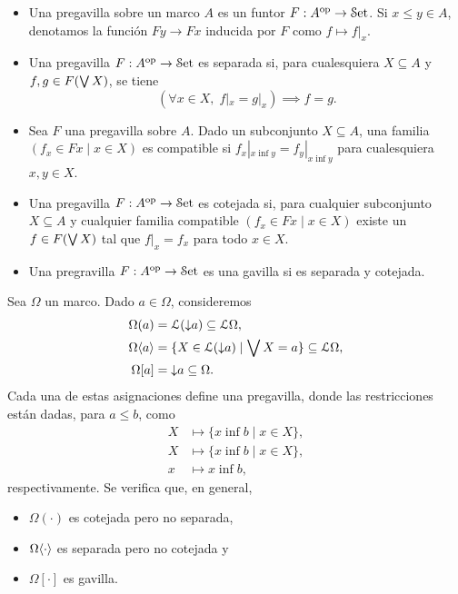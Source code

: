\begin{definition}
    \leavevmode
    \begin{itemize}
        \item
        Una pregavilla sobre un marco $A$
        es un funtor $F:A^{\mathrm{op}}\to\mathcal{S}\mathrm{et}$.
        Si $x\leq y\in A$, denotamos la función
        $Fy\to Fx$ inducida por $F$ como $f\mapsto f|_x$.
        \item
        Una pregavilla $F:A^{\mathrm{op}}\to\mathcal{S}\mathrm{et}$ es separada si,
        para cualesquiera $X\subseteq A$ y $f,g\in F(\bigvee X)$,
        se tiene
        \[
            (\forall x\in X,\; f|_x=g|_x)\implies f=g
        .\]
        \item
        Sea $F$ una pregavilla sobre $A$.
        Dado un subconjunto $X\subseteq A$,
        una familia $(f_x\in Fx\mid x\in X)$
        es compatible si $f_x|_{x\inf y}=f_y|_{x\inf y}$
        para cualesquiera $x,y\in X$.
        \item
        Una pregavilla $F:A^{\mathrm{op}}\to\mathcal{S}\mathrm{et}$ es cotejada si,
        para cualquier subconjunto $X\subseteq A$
        y cualquier familia compatible
        $(f_x\in Fx\mid x\in X)$
        existe un $f\in F(\bigvee X)$ tal que
        $f|_x=f_x$ para todo $x\in X$.
        \item
        Una pregravilla $F:A^{\mathrm{op}}\to\mathcal{S}\mathrm{et}$ es una gavilla
        si es separada y cotejada.
    \end{itemize}
\end{definition}

\begin{example}
    Sea $\Omega$ un marco.
    Dado $a\in\Omega$, consideremos
    \begin{align*}
        \Omega(a)
            &= \mathcal{L}({\downarrow} a)
            \subseteq\mathcal{L}\Omega, \\
        \Omega\langle a\rangle
            &= \{X\in\mathcal{L}({\downarrow} a)\mid\bigvee X=a\}
            \subseteq\mathcal{L}\Omega, \\
        \Omega[a]
            &= {\downarrow} a
            \subseteq\Omega.
    \end{align*}
    Cada una de estas asignaciones define una pregavilla,
    donde las restricciones están dadas, para $a\leq b$, como
    \begin{align*}
        X &\mapsto \{x\inf b\mid x\in X\}, \\
        X &\mapsto \{x\inf b\mid x\in X\}, \\
        x &\mapsto x\inf b,
    \end{align*}
    respectivamente.
    Se verifica que, en general,
    \begin{itemize}
        \item $\Omega(\cdot)$ es cotejada pero no separada,
        \item $\Omega\langle\cdot\rangle$ es separada pero no cotejada y
        \item $\Omega[\cdot]$ es gavilla.
    \end{itemize}
\end{example}

